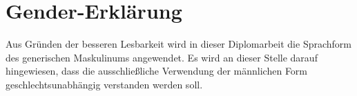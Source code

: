 \null\vfill
{}
\section*{Gender-Erklärung}
Aus Gründen der besseren Lesbarkeit wird in dieser Diplomarbeit  die Sprachform des generischen Maskulinums angewendet. Es wird an dieser Stelle darauf hingewiesen, dass die ausschließliche Verwendung der männlichen Form geschlechtsunabhängig verstanden werden soll.   
\vfill\null
\clearpage